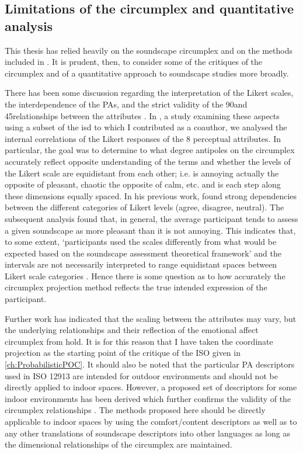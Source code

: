 \subsection{Limitations of the circumplex and quantitative analysis}
This thesis has relied heavily on the soundscape circumplex and on the methods included in \cite{ISO12913Part2}. It is prudent, then, to consider some of the critiques of the circumplex and of a quantitative approach to soundscape studies more broadly.

There has been some discussion regarding the interpretation of the Likert scales, the interdependence of the PAs, and the strict validity of the 90\textdegree and 45\textdegree relationships between the attributes \citep{Lionello2021Thesis}. In \citet{Lionello2021Introducing}, a study examining these aspects using a subset of the \gls{isd} to which I contributed as a coauthor, we analysed the internal correlations of the Likert responses of the 8 perceptual attributes. In particular, the goal was to determine to what degree antipoles on the circumplex accurately reflect opposite understanding of the terms and whether the levels of the Likert scale are equidistant from each other; i.e. is annoying actually the opposite of pleasant, chaotic the opposite of calm, etc. and is each step along these dimensions equally spaced. In his previous work, \citet{Lionello2019dimension} found strong dependencies between the different categories of Likert levels (agree, disagree, neutral). The subsequent analysis found that, in general, the average participant tends to assess a given soundscape as more pleasant than it is not annoying. This indicates that, to some extent, `participants used the scales differently from what would be expected based on the soundscape assessment theoretical framework' and the intervals are not necessarily interpreted to range equidistant spaces between Likert scale categories \citep{Lionello2021Introducing}. Hence there is some question as to how accurately the circumplex projection method reflects the true intended expression of the participant.

Further work has indicated that the scaling between the attributes may vary, but the underlying relationships and their reflection of the emotional affect circumplex from \citet{Russell1980circumplex} hold. It is for this reason that I have taken the coordinate projection as the starting point of the critique of the ISO given in \cref{ch:ProbabilisticPOC}. It should also be noted that the particular PA descriptors used in ISO 12913 are intended for outdoor environments and should not be directly applied to indoor spaces. However, a proposed set of descriptors for some indoor environments has been derived which further confirms the validity of the circumplex relationships \citep{Torresin2020Indoor}. The methods proposed here should be directly applicable to indoor spaces by using the comfort/content descriptors as well as to any other translations of soundscape descriptors into other languages \citep{Aletta2020Soundscape} as long as the dimensional relationships of the circumplex are maintained.


